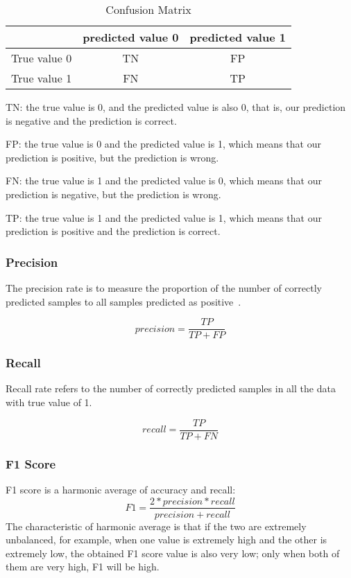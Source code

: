 \begin{table}  \centering
  \caption{Confusion Matrix}
  \label{tbl:overall-experiments}
  \begin{tabular}{ccc}
  \toprule
    & predicted value 0 & predicted value 1  \\
  \midrule
    True value 0 & TN & FP  \\
    True value 1 & FN & TP  \\
  \bottomrule
  \end{tabular}
\end{table}


TN:
the true value is 0,
and the predicted value is also 0,
that is,
our prediction is negative and the prediction is correct.

FP:
the true value is 0 and the predicted value is 1,
which means that our prediction is positive,
but the prediction is wrong.

FN:
the true value is 1 and the predicted value is 0,
 which means that our prediction is negative,
  but the prediction is wrong.

TP:
the true value is 1 and the predicted value is 1,
which means that our prediction is positive and the
prediction is correct.

\subsubsection{Precision}

The precision rate is to measure the proportion of
the number of correctly predicted samples to all
samples predicted as positive~\cite{ting2010precision}.

\begin{equation}
  precision=\frac{TP}{TP+FP}
\end{equation}

\subsubsection{Recall}
Recall rate refers to the number of correctly
predicted samples in all the data with true
value of 1.

\begin{equation}
  recall=\frac{TP}{TP+FN}
\end{equation}

\subsubsection{F1 Score}
F1 score is a harmonic average of accuracy and recall:
\begin{equation}
  F1=\frac{2*precision*recall}{precision+recall}
\end{equation}
The characteristic of harmonic average is that if
the two are extremely unbalanced,
for example, when one value is extremely
high and the other is extremely low,
the obtained F1 score value is also very low;
only when both of them are very high,
F1 will be high.
